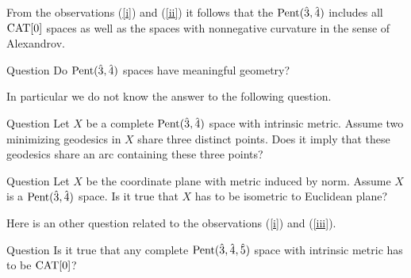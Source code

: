 \documentclass[oneside,a4paper]{amsart}
\begin{document}
From the observations (\ref{i}) and (\ref{ii}) it follows that the $\text{\rm Pent}(\hat 3,\hat 4)$
includes all $\mathrm{CAT}[0]$ spaces 
as well as the spaces with nonnegative curvature in the sense of Alexandrov.

\begin{thm}{Question}
 Do $\text{\rm Pent}(\hat 3,\hat 4)$ spaces have meaningful geometry?
\end{thm}
In particular we do not know the answer to the following question.

\begin{thm}{Question}
Let $X$ be a complete $\text{\rm Pent}(\hat 3,\hat 4)$ space with intrinsic metric.
Assume two minimizing geodesics in $X$ share three distinct points.
Does it imply that these geodesics share an arc containing these three points?
\end{thm}

\begin{thm}{Question}
Let $X$ be the coordinate plane with metric induced by norm.
Assume $X$ is a $\text{\rm Pent}(\hat 3,\hat 4)$ space.
Is it true that $X$ has to be isometric to Euclidean plane?
\end{thm}


Here is an other question related to the observations (\ref{i}) and (\ref{iii}).

\begin{thm}{Question}
Is it true that any complete  $\text{\rm Pent}(\hat 3,\hat 4,\hat 5)$ space with intrinsic metric has to be $\mathrm{CAT}[0]$?
\end{thm} 
\end{document}
